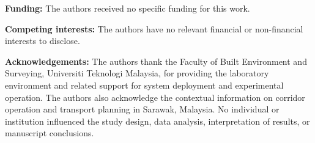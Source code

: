 \documentclass[smallcondensed]{svjour3}
\begin{document}
\noindent\textbf{Funding:} The authors received no specific funding for this work.\par

\noindent\textbf{Competing interests:} The authors have no relevant financial or non-financial interests to disclose.\par

\noindent\textbf{Acknowledgements:} The authors thank the Faculty of Built Environment and Surveying, Universiti Teknologi Malaysia, for providing the laboratory environment and related support for system deployment and experimental operation. The authors also acknowledge the contextual information on corridor operation and transport planning in Sarawak, Malaysia. No individual or institution influenced the study design, data analysis, interpretation of results, or manuscript conclusions.\par
\end{document}
